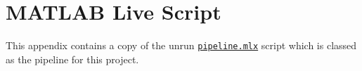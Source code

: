 \chapter{MATLAB Live Script}
\label{ap:liveScript}

This appendix contains a copy of the unrun \href{https://github.com/JNSRYA006/sar-parameter-extraction-pipeline/blob/main/functions/pipeline.mlx}{\lstinline{pipeline.mlx}} script which is classed as the pipeline for this project.




